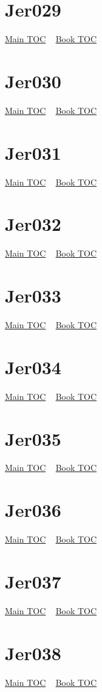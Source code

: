 \documentclass{book}
\begin{document}
  \section{Jer029}\hyperlink{toc}{Main TOC} ~ \hyperref[subsec:Jer]{Book TOC} 
  \section{Jer030}\hyperlink{toc}{Main TOC} ~ \hyperref[subsec:Jer]{Book TOC} 
  \section{Jer031}\hyperlink{toc}{Main TOC} ~ \hyperref[subsec:Jer]{Book TOC} 
  \section{Jer032}\hyperlink{toc}{Main TOC} ~ \hyperref[subsec:Jer]{Book TOC} 
  \section{Jer033}\hyperlink{toc}{Main TOC} ~ \hyperref[subsec:Jer]{Book TOC} 
  \section{Jer034}\hyperlink{toc}{Main TOC} ~ \hyperref[subsec:Jer]{Book TOC} 
  \section{Jer035}\hyperlink{toc}{Main TOC} ~ \hyperref[subsec:Jer]{Book TOC} 
  \section{Jer036}\hyperlink{toc}{Main TOC} ~ \hyperref[subsec:Jer]{Book TOC} 
  \section{Jer037}\hyperlink{toc}{Main TOC} ~ \hyperref[subsec:Jer]{Book TOC} 
  \section{Jer038}\hyperlink{toc}{Main TOC} ~ \hyperref[subsec:Jer]{Book TOC} 
\end{document}
